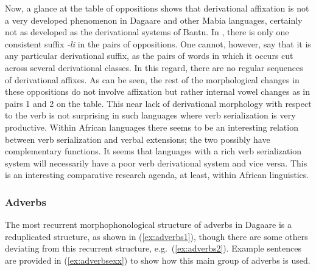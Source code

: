 Now, a glance at the table of oppositions shows that derivational affixation is not a
very developed phenomenon in Dagaare and other Mabia languages, certainly not as
developed as the derivational systems of Bantu. In , there is only one
consistent suffix \textit{-li} in the pairs of oppositions. One cannot, however, say that it is any
particular derivational suffix, as the pairs of words in which it occurs cut across several
derivational classes. In this regard, there are no regular sequences of derivational affixes. As
can be seen, the rest of the morphological changes in these oppositions do not involve
affixation but rather internal vowel changes as in pairs 1 and 2 on the table.
This near lack of derivational morphology with respect to the verb is not surprising in
such languages where verb serialization is very productive. Within African languages there seems to be an interesting relation between verb serialization and verbal extensions; the
two possibly have complementary functions. It seems that languages with a rich verb
serialization system will necessarily have a poor verb derivational system and vice versa. This
is an interesting comparative research agenda, at least, within African linguistics.

\largerpage
\subsubsection{Adverbs}
The most recurrent morphophonological structure of adverbs in Dagaare is a 
reduplicated structure, as shown in (\ref{ex:adverbs1}), though there are some others deviating from this
recurrent structure, e.g.~(\ref{ex:adverbs2}). Example sentences are provided in (\ref{ex:adverbsexx}) to show how this main
group of adverbs is used.



